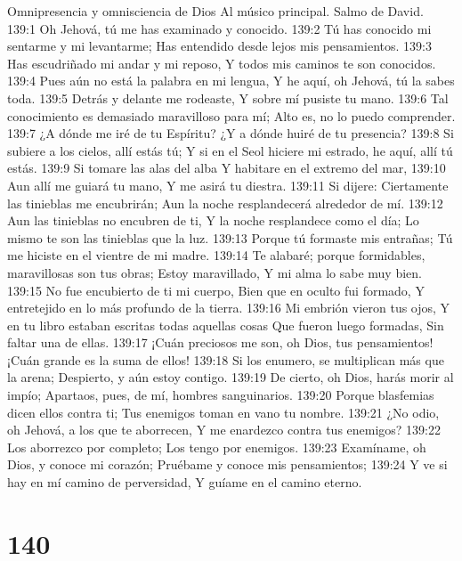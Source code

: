 Omnipresencia y omnisciencia de Dios 
Al músico principal. Salmo de David. 

139:1 Oh Jehová, tú me has examinado y conocido. 
139:2 Tú has conocido mi sentarme y mi levantarme; 
Has entendido desde lejos mis pensamientos. 
139:3 Has escudriñado mi andar y mi reposo, 
Y todos mis caminos te son conocidos. 
139:4 Pues aún no está la palabra en mi lengua, 
Y he aquí, oh Jehová, tú la sabes toda. 
139:5 Detrás y delante me rodeaste, 
Y sobre mí pusiste tu mano. 
139:6 Tal conocimiento es demasiado maravilloso para mí; 
Alto es, no lo puedo comprender. 
139:7 ¿A dónde me iré de tu Espíritu? 
¿Y a dónde huiré de tu presencia? 
139:8 Si subiere a los cielos, allí estás tú; 
Y si en el Seol hiciere mi estrado, he aquí, allí tú estás. 
139:9 Si tomare las alas del alba 
Y habitare en el extremo del mar, 
139:10 Aun allí me guiará tu mano, 
Y me asirá tu diestra. 
139:11 Si dijere: Ciertamente las tinieblas me encubrirán; 
Aun la noche resplandecerá alrededor de mí. 
139:12 Aun las tinieblas no encubren de ti, 
Y la noche resplandece como el día; 
Lo mismo te son las tinieblas que la luz. 
139:13 Porque tú formaste mis entrañas; 
Tú me hiciste en el vientre de mi madre. 
139:14 Te alabaré; porque formidables, maravillosas son tus obras; 
Estoy maravillado, 
Y mi alma lo sabe muy bien. 
139:15 No fue encubierto de ti mi cuerpo, 
Bien que en oculto fui formado, 
Y entretejido en lo más profundo de la tierra. 
139:16 Mi embrión vieron tus ojos, 
Y en tu libro estaban escritas todas aquellas cosas 
Que fueron luego formadas, 
Sin faltar una de ellas. 
139:17 ¡Cuán preciosos me son, oh Dios, tus pensamientos! 
¡Cuán grande es la suma de ellos! 
139:18 Si los enumero, se multiplican más que la arena; 
Despierto, y aún estoy contigo. 
139:19 De cierto, oh Dios, harás morir al impío; 
Apartaos, pues, de mí, hombres sanguinarios. 
139:20 Porque blasfemias dicen ellos contra ti; 
Tus enemigos toman en vano tu nombre. 
139:21 ¿No odio, oh Jehová, a los que te aborrecen, 
Y me enardezco contra tus enemigos? 
139:22 Los aborrezco por completo; 
Los tengo por enemigos. 
139:23 Examíname, oh Dios, y conoce mi corazón; 
Pruébame y conoce mis pensamientos; 
139:24 Y ve si hay en mí camino de perversidad, 
Y guíame en el camino eterno. 

\chapter{140}

